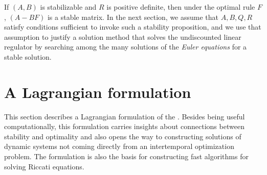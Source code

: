\medskip
{}  If $(A,B)$ is stabilizable and $R$ is positive definite,
then under the optimal  rule $F$, $(A-BF)$ is a stable matrix.
\medskip
In the next section, we assume that $A, B, Q, R$ satisfy
conditions  sufficient to invoke such a stability proposition, and
we use that assumption to justify a solution method that
solves the undiscounted linear regulator by searching among the
many solutions of the {\it Euler equations}
for a stable solution.
\section{A Lagrangian formulation}\label{lagrangianformulation}%
This section describes a Lagrangian formulation of the
.
Besides being
useful computationally, this formulation carries
insights about  connections  between
stability and optimality and also
opens the way to constructing solutions of dynamic systems
 not coming directly from an  intertemporal optimization
 problem.
The formulation is also the basis for constructing fast algorithms for solving Riccati equations.
 

